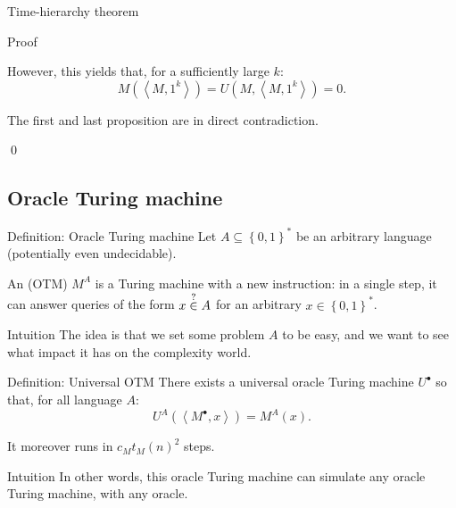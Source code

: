 \documentclass[a4paper]{article}
\begin{document}
\begin{parag}{Time-hierarchy theorem}
\begin{subparag}{Proof}
\begin{itemize}
            However, this yields that, for a sufficiently large $k$: 
            \[M\left(\left\langle M, 1^k \right\rangle\right) = U\left(M, \left\langle M, 1^k \right\rangle\right) = 0.\]
        \end{itemize}

        The first and last proposition are in direct contradiction.

        \qed
    \end{subparag}
\end{parag}

\subsection{Oracle Turing machine}

\begin{parag}{Definition: Oracle Turing machine}
    Let $A \subseteq \left\{0, 1\right\}^*$ be an arbitrary language (potentially even undecidable). 

    An  (OTM) $M^A$ is a Turing machine with a new instruction: in a single step, it can answer queries of the form $x \over{\in}{?} A$ for an arbitrary $x \in \left\{0, 1\right\}^*$.

    \begin{subparag}{Intuition}
        The idea is that we set some problem $A$ to be easy, and we want to see what impact it has on the complexity world.
    \end{subparag}
\end{parag}

\begin{parag}{Definition: Universal OTM}
    There exists a universal oracle Turing machine $U^{\bullet}$ so that, for all language $A$: 
    \[U^A\left(\left\langle M^{\bullet}, x \right\rangle\right) = M^A\left(x\right).\]
    
    It moreover runs in  $c_M t_M\left(n\right)^2$ steps.

    \begin{subparag}{Intuition}
        In other words, this oracle Turing machine can simulate any oracle Turing machine, with any oracle.
    \end{subparag}
\end{parag}
\end{document}
